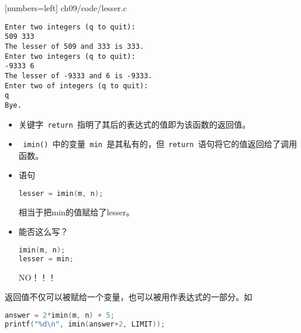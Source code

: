 \begin{frame}

[numbers=left]
{ch09/code/lesser.c}
\end{frame}

\begin{frame}[fragile]

\begin{lstlisting}[backgroundcolor=\color{red!10}]
Enter two integers (q to quit):
509 333
The lesser of 509 and 333 is 333.
Enter two integers (q to quit):
-9333 6
The lesser of -9333 and 6 is -9333.
Enter two of integers (q to quit):
q
Bye.
\end{lstlisting}
\end{frame}

\begin{frame}[fragile]
\begin{itemize}
\item
关键字\lstinline| return |指明了其后的表达式的值即为该函数的返回值。\\[0.1in]
\item 
\lstinline| imin() |中的变量\lstinline| min |是其私有的，但\lstinline| return |语句将它的值返回给了调用函数。\\[0.1in]
\item 
语句
\begin{lstlisting}[language=c,backgroundcolor=\color{red!10}]
lesser = imin(m, n);
\end{lstlisting}
相当于把min的值赋给了lesser。
\\[0.1in]
\item
能否这么写？
\begin{lstlisting}[language=c,backgroundcolor=\color{red!10}]
imin(m, n);
lesser = min;
\end{lstlisting} \pause
{\Huge NO！！！}
\end{itemize}
\end{frame}

\begin{frame}[fragile]
返回值不仅可以被赋给一个变量，也可以被用作表达式的一部分。如
\begin{lstlisting}[language=c,backgroundcolor=\color{red!10}]
answer = 2*imin(m, n) + 5;
printf("%d\n", imin(answer+2, LIMIT));
\end{lstlisting}

\end{frame}


